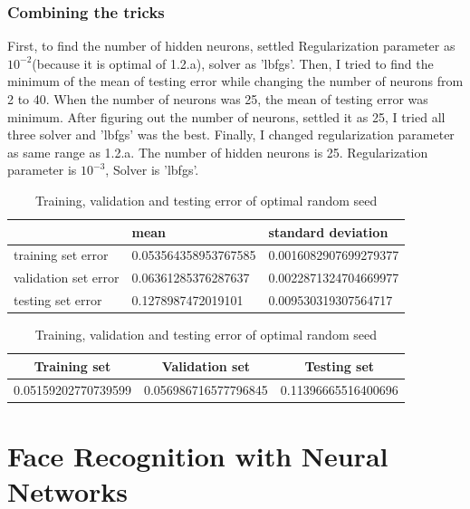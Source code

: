 \documentclass[a4paper]{article}
\begin{document}
\subsubsection{Combining the tricks}
First, to find the number of hidden neurons, settled Regularization parameter as
$10^{-2}$(because it is optimal of 1.2.a), solver as 'lbfgs'. Then, I tried to find the minimum of the mean of
testing error while changing the number of neurons from 2 to 40. When the number
of neurons was 25, the mean of testing error was minimum. After figuring out the
number of neurons, settled it as 25, I tried all three solver and 'lbfgs' was the best.
Finally, I changed regularization parameter as same range as 1.2.a.
The number of hidden neurons is 25. Regularization parameter is $10^{-3}$, Solver is 'lbfgs'.
\begin{table}[h]
  \begin{center}
    \begin{tabular}{|l|l|l|}
      \hline
      & mean                 & standard deviation    \\ \hline
      training set error   & 0.053564358953767585 & 0.0016082907699279377 \\ \hline
      validation set error & 0.06361285376287637  & 0.0022871324704669977 \\ \hline
      testing set error    & 0.1278987472019101   & 0.009530319307564717  \\ \hline
    \end{tabular}
    \caption{Mean and standard deviation of each set}
    \vspace{2em}
    \begin{tabular}{|c|c|c|}
      \hline
      Training set        & Validation set       & Testing set         \\ \hline
      0.05159202770739599 & 0.056986716577796845 & 0.11396665516400696 \\ \hline
    \end{tabular}
    \caption{Training, validation and testing error of optimal random seed}
  \end{center}
\end{table}
\clearpage
\section{Face Recognition with Neural Networks}
\end{document}
